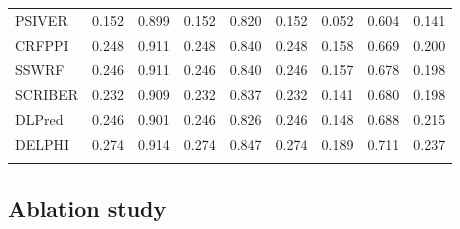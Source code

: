 \begin{table}
\begin{tabular}{@{}l@{\ }*{8}{r}}
    PSIVER & \cellcolor[rgb]{ .988,  .988,  1}0.152 & \cellcolor[rgb]{ .937,  .953,  .937}0.899 & \cellcolor[rgb]{ .988,  .988,  1}0.152 & \cellcolor[rgb]{ .988,  .988,  1}0.820 & \cellcolor[rgb]{ .988,  .988,  1}0.152 & \cellcolor[rgb]{ .988,  .988,  1}0.052 & \cellcolor[rgb]{ .706,  .784,  .659}0.604 & \cellcolor[rgb]{ .941,  .957,  .945}0.141 \\
    CRFPPI & \cellcolor[rgb]{ .475,  .616,  .384}0.248 & \cellcolor[rgb]{ .478,  .62,  .388}0.911 & \cellcolor[rgb]{ .475,  .616,  .384}0.248 & \cellcolor[rgb]{ .49,  .627,  .4}0.840 & \cellcolor[rgb]{ .475,  .616,  .384}0.248 & \cellcolor[rgb]{ .478,  .616,  .384}0.158 & \cellcolor[rgb]{ .475,  .616,  .384}0.669 & \cellcolor[rgb]{ .565,  .682,  .49}0.200 \\
    SSWRF & \cellcolor[rgb]{ .482,  .624,  .392}0.246 & \cellcolor[rgb]{ .486,  .624,  .396}0.911 & \cellcolor[rgb]{ .482,  .624,  .392}0.246 & \cellcolor[rgb]{ .498,  .635,  .412}0.840 & \cellcolor[rgb]{ .482,  .624,  .392}0.246 & \cellcolor[rgb]{ .486,  .624,  .396}0.157 & \cellcolor[rgb]{ .447,  .596,  .349}0.678 & \cellcolor[rgb]{ .576,  .69,  .506}0.198 \\
    SCRIBER & \cellcolor[rgb]{ .557,  .675,  .482}0.232 & \cellcolor[rgb]{ .553,  .671,  .475}0.909 & \cellcolor[rgb]{ .557,  .675,  .482}0.232 & \cellcolor[rgb]{ .569,  .686,  .498}0.837 & \cellcolor[rgb]{ .557,  .675,  .482}0.232 & \cellcolor[rgb]{ .557,  .678,  .482}0.141 & \cellcolor[rgb]{ .439,  .592,  .341}0.680 & \cellcolor[rgb]{ .576,  .69,  .506}0.198 \\
    DLPred & \cellcolor[rgb]{ .482,  .62,  .392}0.246 & \cellcolor[rgb]{ .859,  .894,  .843}0.901 & \cellcolor[rgb]{ .482,  .62,  .388}0.246 & \cellcolor[rgb]{ .855,  .894,  .839}0.826 & \cellcolor[rgb]{ .482,  .62,  .388}0.246 & \cellcolor[rgb]{ .529,  .655,  .447}0.148 & \cellcolor[rgb]{ .412,  .569,  .306}0.688 & \cellcolor[rgb]{ .467,  .612,  .373}0.215 \\
    DELPHI & \cellcolor[rgb]{ .329,  .51,  .208}0.274 & \cellcolor[rgb]{ .329,  .51,  .208}0.914 & \cellcolor[rgb]{ .329,  .51,  .208}0.274 & \cellcolor[rgb]{ .329,  .51,  .208}0.847 & \cellcolor[rgb]{ .329,  .51,  .208}0.274 & \cellcolor[rgb]{ .329,  .51,  .208}0.189 & \cellcolor[rgb]{ .329,  .51,  .208}0.711 & \cellcolor[rgb]{ .329,  .51,  .208}0.237 \\
\label{tab_ds186_164_72}
    \end{tabular}%
\end{table}%

\subsection{Ablation study}
